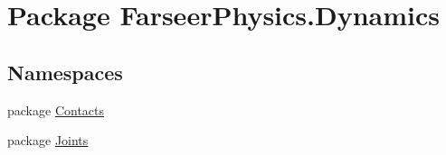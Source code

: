 \hypertarget{namespace_farseer_physics_1_1_dynamics}{\section{Package Farseer\+Physics.\+Dynamics}
\label{namespace_farseer_physics_1_1_dynamics}
}
\subsection*{Namespaces}
\begin{DoxyCompactItemize}
\item 
package \hyperlink{namespace_farseer_physics_1_1_dynamics_1_1_contacts}{Contacts}
\item 
package \hyperlink{namespace_farseer_physics_1_1_dynamics_1_1_joints}{Joints}
\end{DoxyCompactItemize}
